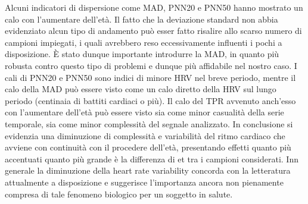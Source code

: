 \documentclass[a4paper, 12pt]{book}
\begin{document}
Alcuni indicatori di dispersione come MAD, PNN20 e PNN50 hanno mostrato un calo con l'aumentare dell'età.
Il fatto che la deviazione standard non abbia evidenziato alcun tipo di andamento può esser fatto risalire allo scarso numero di campioni impiegati, i quali avrebbero reso eccessivamente influenti i pochi a disposizione.
È stato dunque importante introdurre la MAD, in quanto più robusta contro questo tipo di problemi e dunque più affidabile nel nostro caso.
I cali di PNN20 e PNN50 sono indici di minore HRV nel breve periodo, mentre il calo della MAD può essere visto come un calo diretto della HRV sul lungo periodo (centinaia di battiti cardiaci o più).
Il calo del TPR avvenuto anch'esso con l'aumentare dell'età può essere visto sia come minor casualità della serie temporale, sia come minor complessità del segnale analizzato.
In conclusione si evidenzia una diminuzione di complessità e variabilità del ritmo cardiaco che avviene con continuità con il procedere dell'età, presentando effetti quanto più accentuati quanto più grande è la differenza di et tra i campioni considerati.
Inn generale la diminuzione della heart rate variability concorda con la letteratura attualmente a disposizione e suggerisce l'importanza ancora non pienamente compresa di tale fenomeno biologico per un soggetto in salute.



\thispagestyle{empty}
\newpage
\thispagestyle{empty}





\end{document}
